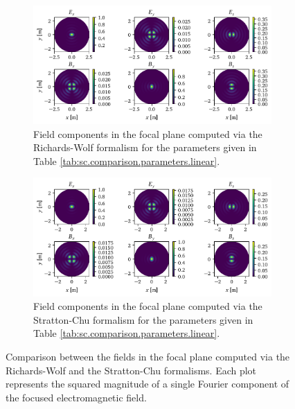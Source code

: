 \documentclass[11pt,SymmetricalJury]{inrsthesis/inrsthesis}
\begin{document}
\begin{figure}
  \begin{subfigure}{\textwidth}
    \centering
    \includegraphics[width=\textwidth]{figs/RichardsWolf_fpNA1.pdf}
    \caption[Richards-Wolf field components for the HNA.LIN.G.NA1 case.]
            {Field components in the focal plane computed via the Richards-Wolf
            formalism for the parameters given in Table \ref{tab:sc.comparison.parameters.linear}.}
    \label{fig:sc.rw.hna-lin-g-na1}
  \end{subfigure}

  \begin{subfigure}{\textwidth}
    \centering
    \includegraphics[width=\textwidth]{figs/StrattonChu_fpNA1.pdf}
    \caption[Stratton-Chu field components for the HNA.LIN.G.NA1 case.]
            {Field components in the focal plane computed via the Stratton-Chu
            formalism for the parameters given in Table \ref{tab:sc.comparison.parameters.linear}.}
   \label{fig:sc.sc.hna-lin-g-na1}
  \end{subfigure}

\caption[Richards-Wolf vs Stratton-Chu: fields in the focal plane, HNA.LIN.G.NA1.]
        {Comparison between the fields in the focal plane computed via
        the Richards-Wolf and the Stratton-Chu formalisms. Each plot represents
        the squared magnitude of a single Fourier component of the focused
        electromagnetic field.}
\label{fig:sc.sc-vs-rw-hna-lin-g-na1}
\end{figure}
\end{document}
